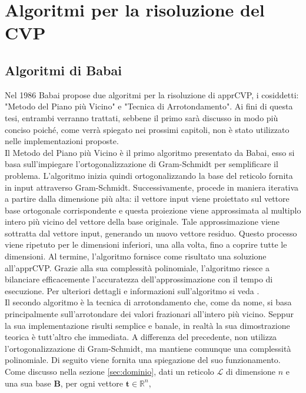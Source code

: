 \section{Algoritmi per la risoluzione del CVP}
\label{CVP}


\subsection{Algoritmi di Babai}
\label{sec:babai}
Nel 1986 Babai\cite{Babai86}  propose due algoritmi per la risoluzione di apprCVP, i cosiddetti:
"Metodo del Piano più Vicino" e "Tecnica di Arrotondamento". Ai fini di questa tesi, 
entrambi verranno trattati, sebbene il primo sarà discusso in modo più conciso 
poiché, come verrà spiegato nei prossimi capitoli, non è stato utilizzato nelle 
implementazioni proposte. \\
Il Metodo del Piano più Vicino è il primo algoritmo presentato da Babai, esso si basa sull'impiegare 
l'ortogonalizzazione di Gram-Schmidt per semplificare il problema. L'algoritmo inizia quindi
ortogonalizzando la base del reticolo fornita in 
input attraverso Gram-Schmidt. Successivamente, procede in maniera iterativa a partire 
dalla dimensione più alta: il vettore input viene proiettato sul vettore base ortogonale 
corrispondente e questa proiezione viene approssimata al multiplo intero più vicino del 
vettore della base originale. Tale approssimazione viene sottratta dal vettore input, 
generando un nuovo vettore residuo. Questo processo viene ripetuto per le dimensioni 
inferiori, una alla volta, fino a coprire tutte le dimensioni. Al termine, l'algoritmo 
fornisce come risultato una soluzione all'apprCVP. 
Grazie alla sua complessità polinomiale, l'algoritmo riesce a bilanciare efficacemente 
l'accuratezza dell'approssimazione con il tempo di esecuzione. Per ulteriori dettagli e 
informazioni sull'algoritmo si veda \cite{Galbraith18}. 
\\
Il secondo algoritmo è la tecnica di arrotondamento che, come da nome, si basa
principalmente sull'arrotondare dei valori frazionari all'intero più vicino.
Seppur la sua implementazione risulti semplice e banale, in realtà la sua dimostrazione teorica
è tutt'altro che immediata. 
A differenza del precedente, 
non utilizza l'ortogonalizzazione di Gram-Schmidt, ma mantiene comunque una complessità 
polinomiale. Di seguito viene fornita una spiegazione del suo funzionamento. \\
Come discusso nella sezione \ref{sec:dominio}, dati un reticolo $\mathcal{L}$ di dimensione
$n$ e una sua base $\mathbf{B}$, per ogni vettore $\mathbf{t} \in \mathbb{R}^n$,
